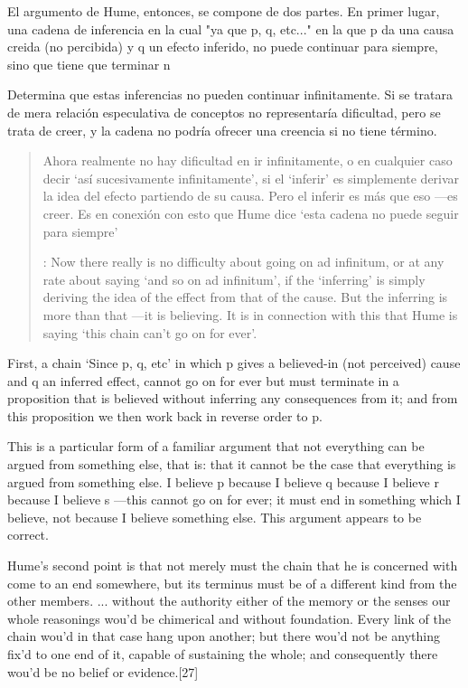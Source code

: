 El argumento de Hume, entonces, se compone de dos partes.
  En primer lugar, una cadena de inferencia en la cual "ya que p, q, etc..."
  en la que p da una causa creida (no percibida) y q un efecto inferido, no puede continuar
para siempre, sino que tiene que terminar n

  Determina que estas inferencias no pueden continuar infinitamente. Si se tratara
  de mera relación especulativa de conceptos no representaría dificultad, pero se
  trata de creer, y la cadena no podría ofrecer una creencia si no tiene término.
  \blockquote[{\cite[2762]{anscombe2011hoc}}: Now there really is no difficulty
  about going on ad infinitum, or at any rate about saying ‘and so on ad
  infinitum’, if the ‘inferring’ is simply deriving the idea of the effect from
  that of the cause. But the inferring is more than that ---it is believing. It is
  in connection with this that Hume is saying ‘this chain can’t go on for
  ever’.]{Ahora realmente no hay dificultad en ir infinitamente, o en cualquier
    caso decir `así sucesivamente infinitamente', si el `inferir' es simplemente
    derivar la idea del efecto partiendo de su causa. Pero el inferir es más que
    eso ---es creer. Es en conexión con esto que Hume dice `esta cadena no puede
    seguir para siempre'}

  First, a chain ‘Since p, q, etc’ in which p gives a believed-in (not perceived)
  cause and q an inferred effect, cannot go on for ever but must terminate in a
  proposition that is believed without inferring any consequences from it; and
  from this proposition we then work back in reverse order to p.

  This is a particular form of a familiar argument that not everything can be
  argued from something else, that is: that it cannot be the case that everything
  is argued from something else. I believe p because I believe q because I believe
  r because I believe s ---this cannot go on for ever; it must end in something
  which I believe, not because I believe something else. This argument appears to
  be correct.

Hume’s second point is that not merely must the chain that he is concerned with
come to an end somewhere, but its terminus must be of a different kind from the
other members. ... without the authority either of the memory or the senses our
whole reasonings wou’d be chimerical and without foundation. Every link of the
chain wou’d in that case hang upon another; but there wou’d not be anything
fix’d to one end of it, capable of sustaining the whole; and consequently there
wou’d be no belief or evidence.[27]


